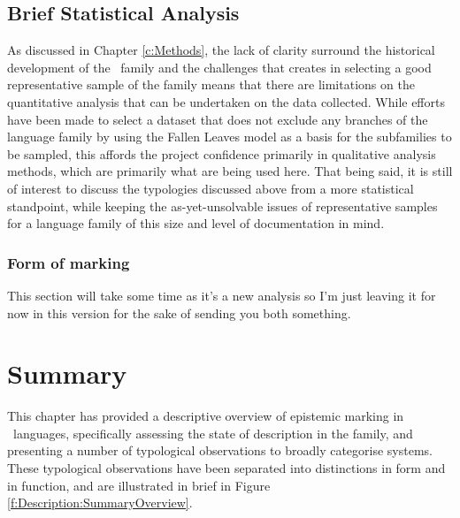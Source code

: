\subsection{Brief Statistical Analysis}
As discussed in Chapter \ref{c:Methods}, the lack of clarity surround the historical development of the \lfam\ family and the challenges that creates in selecting a good representative sample of the family means that there are limitations on the quantitative analysis that can be undertaken on the data collected. While efforts have been made to select a dataset that does not exclude any branches of the language family by using the Fallen Leaves model \cite{VanDriem2014} as a basis for the subfamilies to be sampled, this affords the project confidence primarily in qualitative analysis methods, which are primarily what are being used here. That being said, it is still of interest to discuss the typologies discussed above from a more statistical standpoint, while keeping the as-yet-unsolvable issues of representative samples for a language family of this size and level of documentation in mind. 
\subsubsection{Form of marking}
This section will take some time as it's a new analysis so I'm just leaving it for now in this version for the sake of sending you both something.

\section{Summary}
This chapter has provided a descriptive overview of epistemic marking in \lfam\ languages, specifically assessing the state of description in the family, and presenting a number of typological observations to broadly categorise systems. These typological observations have been separated into distinctions in form and in function, and are illustrated in brief in Figure \ref{f:Description:SummaryOverview}.

